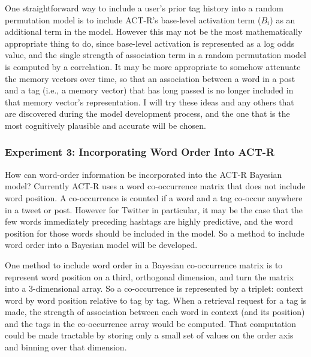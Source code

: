 \documentclass[man,floatsintext,donotrepeattitle]{apa6}
\begin{document}
One straightforward way to include a user's prior tag history into a random permutation model is to include ACT-R's base-level activation term ($B_{i}$) as an additional term in the model.
However this may not be the most mathematically appropriate thing to do, since base-level activation is represented as a log odds value,
and the single strength of association term in a random permutation model is computed by a correlation.
It may be more appropriate to somehow attenuate the memory vectors over time,
so that an association between a word in a post and a tag (i.e., a memory vector) that has long passed is no longer included in that memory vector's representation.
I will try these ideas and any others that are discovered during the model development process, and the one that is the most cognitively plausible and accurate will be chosen.

\subsubsection{Experiment 3: Incorporating Word Order Into ACT-R}

How can word-order information be incorporated into the ACT-R Bayesian model?
Currently ACT-R uses a word co-occurrence matrix that does not include word position.
A co-occurrence is counted if a word and a tag co-occur anywhere in a tweet or post.
However for Twitter in particular, it may be the case that the few words immediately preceding hashtags are highly predictive, and the word position for those words should be included in the model.
So a method to include word order into a Bayesian model will be developed.

One method to include word order in a Bayesian co-occurrence matrix is to represent word position on a third, orthogonal dimension, and turn the matrix into a 3-dimensional array.
So a co-occurrence is represented by a triplet: context word by word position relative to tag by tag.
When a retrieval request for a tag is made, the strength of association between each word in context (and its position) and the tags in the co-occurrence array would be computed.
That computation could be made tractable by storing only a small set of values on the order axis and binning over that dimension.
\end{document}
